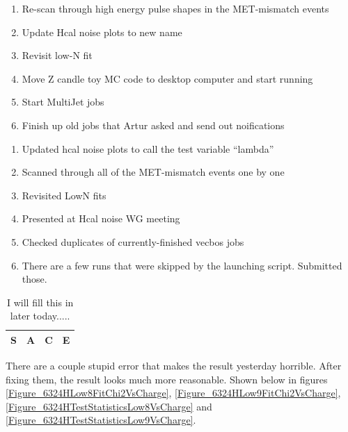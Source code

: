 

\begin{enumerate}
\item Re-scan through high energy pulse shapes in the MET-mismatch events
\item Update Hcal noise plots to new name
\item Revisit low-N fit
\item Move Z candle toy MC code to desktop computer and start running
\item Start MultiJet jobs
\item Finish up old jobs that Artur asked and send out noifications
\end{enumerate}


\begin{enumerate}
\item Updated hcal noise plots to call the test variable ``lambda''
\item Scanned through all of the MET-mismatch events one by one
\item Revisited LowN fits
\item Presented at Hcal noise WG meeting
\item Checked duplicates of currently-finished vecbos jobs
\item There are a few runs that were skipped by the launching script.  Submitted those.
\end{enumerate}


\begin{table}
   \caption{I will fill this in later today.....}
   \centering
   \begin{tabular}{|c|c|c|c|}
      \hline
      S & A & C & E \\\hline
   \end{tabular}
\end{table}


There are a couple stupid error that makes the result yesterday horrible.
After fixing them, the result looks much more reasonable.
Shown below in figures \ref{Figure_6324HLow8FitChi2VsCharge}, \ref{Figure_6324HLow9FitChi2VsCharge},
\ref{Figure_6324HTestStatisticsLow8VsCharge} and \ref{Figure_6324HTestStatisticsLow9VsCharge}.

